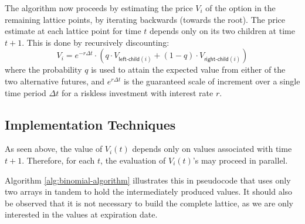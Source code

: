 The algorithm now proceeds by estimating the price $V_i$ of the option
in the remaining lattice points, by iterating backwards (towards the
root). The price estimate at each lattice point for time $t$ depends
only on its two children at time $t+1$. This is done by recursively
discounting:
$$V_{i} = e^{-r\Delta t} \cdot (q\cdot V_{\mathsf{left\textsf{-}child}(i)} + (1-q)\cdot V_{\mathsf{right\textsf{-}child}(i)})$$
where the probability $q$ is used to attain the expected value from
either of the two alternative futures, and $e^{r\Delta t}$ is the
guaranteed scale of increment over a single time period $\Delta t$ for
a riskless investment with interest rate $r$.





\subsection{Implementation Techniques}
As seen above, the value of $V_i(t)$ depends only on values associated
with time $t+1$. Therefore, for each $t$, the evaluation of $V_i(t)$'s may
proceed in parallel.

Algorithm \ref{alg:binomial-algorithm} illustrates this in pseudocode
that uses only two arrays in tandem to hold the intermediately
produced values. It should also be observed that it is not necessary
to build the complete lattice, as we are only interested in the values
at expiration date.

